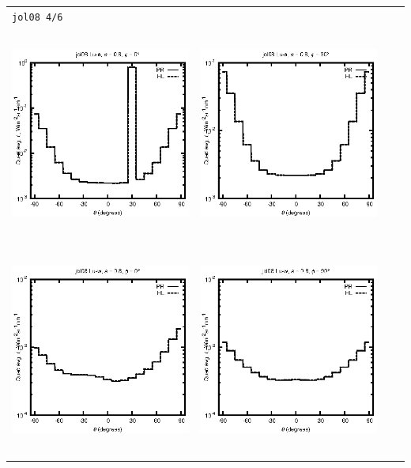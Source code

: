 \begin{tabular}{c c c c}
\multicolumn{4}{l}{\texttt{jol08 4/6}} \\
\includegraphics[height=7cm]{../eps/jol08_Lu_a_fwd.eps} &
\includegraphics[height=7cm]{../eps/jol08_Lu_a_cross.eps}\\
\includegraphics[height=7cm]{../eps/jol08_Lu_w_fwd.eps} &
\includegraphics[height=7cm]{../eps/jol08_Lu_w_cross.eps} \\

\end{tabular}
